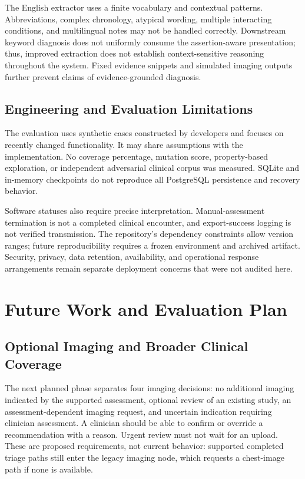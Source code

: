 \documentclass[conference]{IEEEtran}
\begin{document}
The English extractor uses a finite vocabulary and contextual patterns. Abbreviations, complex chronology, atypical wording, multiple interacting conditions, and multilingual notes may not be handled correctly. Downstream keyword diagnosis does not uniformly consume the assertion-aware presentation; thus, improved extraction does not establish context-sensitive reasoning throughout the system. Fixed evidence snippets and simulated imaging outputs further prevent claims of evidence-grounded diagnosis.

\subsection{Engineering and Evaluation Limitations}
The evaluation uses synthetic cases constructed by developers and focuses on recently changed functionality. It may share assumptions with the implementation. No coverage percentage, mutation score, property-based exploration, or independent adversarial clinical corpus was measured. SQLite and in-memory checkpoints do not reproduce all PostgreSQL persistence and recovery behavior.

Software statuses also require precise interpretation. Manual-assessment termination is not a completed clinical encounter, and export-success logging is not verified transmission. The repository's dependency constraints allow version ranges; future reproducibility requires a frozen environment and archived artifact. Security, privacy, data retention, availability, and operational response arrangements remain separate deployment concerns that were not audited here.

\section{Future Work and Evaluation Plan}
\subsection{Optional Imaging and Broader Clinical Coverage}
The next planned phase separates four imaging decisions: no additional imaging indicated by the supported assessment, optional review of an existing study, an assessment-dependent imaging request, and uncertain indication requiring clinician assessment. A clinician should be able to confirm or override a recommendation with a reason. Urgent review must not wait for an upload. These are proposed requirements, not current behavior: supported completed triage paths still enter the legacy imaging node, which requests a chest-image path if none is available.
\end{document}
